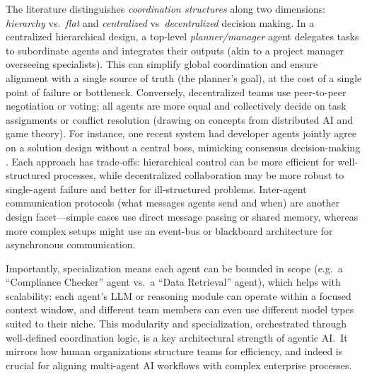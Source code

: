 The literature distinguishes \emph{coordination structures} along two dimensions: \emph{hierarchy} vs.~\emph{flat} and \emph{centralized} vs~\emph{decentralized} decision making. In a centralized hierarchical design, a top-level \emph{planner/manager} agent delegates tasks to subordinate agents and integrates their outputs (akin to a project manager overseeing specialists). This can simplify global coordination and ensure alignment with a single source of truth (the planner's goal), at the cost of a single point of failure or bottleneck. Conversely, decentralized teams use peer-to-peer negotiation or voting; all agents are more equal and collectively decide on task assignments or conflict resolution (drawing on concepts from distributed AI and game theory). For instance, one recent system had developer agents jointly agree on a solution design without a central boss, mimicking consensus decision-making \parencite{xuTransparency2023}. Each approach has trade-offs: hierarchical control can be more efficient for well-structured processes, while decentralized collaboration may be more robust to single-agent failure and better for ill-structured problems. Inter-agent communication protocols (what messages agents send and when) are another design facet---simple cases use direct message passing or shared memory, whereas more complex setups might use an event-bus or blackboard architecture for asynchronous communication.

Importantly, specialization means each agent can be bounded in scope (e.g.~a “Compliance Checker” agent vs.~a “Data Retrieval” agent), which helps with scalability: each agent's LLM or reasoning module can operate within a focused context window, and different team members can even use different model types suited to their niche. This modularity and specialization, orchestrated through well-defined coordination logic, is a key architectural strength of agentic AI.~It mirrors how human organizations structure teams for efficiency, and indeed is crucial for aligning multi-agent AI workflows with complex enterprise processes. 

